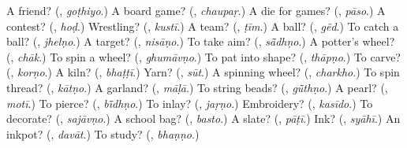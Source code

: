 \begin{tcolorbox}[breakable,colback=teal!4,colframe=teal!35!black,title={Before you move on}]
A friend? (\textbf{}, \emph{goṭhiyo}.) A board game? (\textbf{}, \emph{chaupaṛ}.) A die for games? (\textbf{}, \emph{pāso}.) A contest? (\textbf{}, \emph{hoḍ}.) Wrestling? (\textbf{}, \emph{kustī}.) A team? (\textbf{}, \emph{ṭīm}.) A ball? (\textbf{}, \emph{gẽd}.) To catch a ball? (\textbf{}, \emph{jhelṇo}.) A target? (\textbf{}, \emph{nisāṇo}.) To take aim? (\textbf{}, \emph{sā̃dhṇo}.) A potter's wheel? (\textbf{}, \emph{chāk}.) To spin a wheel? (\textbf{}, \emph{ghumāvṇo}.) To pat into shape? (\textbf{}, \emph{thāpṇo}.) To carve? (\textbf{}, \emph{korṇo}.) A kiln? (\textbf{}, \emph{bhaṭṭī}.) Yarn? (\textbf{}, \emph{sūt}.) A spinning wheel? (\textbf{}, \emph{charkho}.) To spin thread? (\textbf{}, \emph{kātṇo}.) A garland? (\textbf{}, \emph{māḷā}.) To string beads? (\textbf{}, \emph{gū̃thṇo}.) A pearl? (\textbf{}, \emph{motī}.) To pierce? (\textbf{}, \emph{bī̃dhṇo}.) To inlay? (\textbf{}, \emph{jaṛṇo}.) Embroidery? (\textbf{}, \emph{kasīdo}.) To decorate? (\textbf{}, \emph{sajāvṇo}.) A school bag? (\textbf{}, \emph{basto}.) A slate? (\textbf{}, \emph{pāṭī}.) Ink? (\textbf{}, \emph{syāhī}.) An inkpot? (\textbf{}, \emph{davāt}.) To study? (\textbf{}, \emph{bhaṇṇo}.)
\end{tcolorbox}
